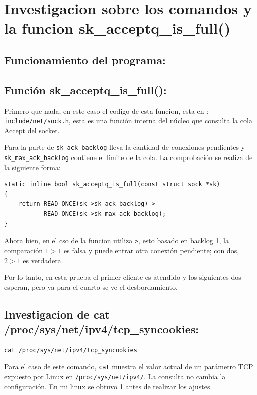 \documentclass[letterpaper,11pt]{article}
\begin{document}

\newpage
{\hypersetup{linkcolor=black}\tableofcontents}
\thispagestyle{empty}
\newpage
\setcounter{page}{1}
\singlespacing

\section{Investigacion sobre los comandos y la funcion sk\_acceptq\_is\_full()}

\subsection{Funcionamiento del programa:}

\subsection{Función sk\_acceptq\_is\_full():}

Primero que nada, en este caso el codigo de esta funcion, esta en :
\texttt{include/net/sock.h}, esta es una función interna del 
núcleo que consulta la cola Accept del socket.

Para la parte de \texttt{sk\_ack\_backlog} lleva la 
cantidad de conexiones pendientes y 
\texttt{sk\_max\_ack\_backlog} contiene el límite de la cola. 
La comprobación se realiza de la siguiente forma:

\begin{lstlisting}[style=cstyle,caption={Comparación utilizada para revisar la cola Accept.}]
static inline bool sk_acceptq_is_full(const struct sock *sk)
{
    return READ_ONCE(sk->sk_ack_backlog) >
           READ_ONCE(sk->sk_max_ack_backlog);
}
\end{lstlisting}

Ahora bien, en el cso de la funcion utiliza \texttt{>}, esto basado en 
backlog 1, la comparación $1 > 1$ es falsa y 
puede entrar otra conexión pendiente; 
con dos, $2 > 1$ es verdadera. 

Por lo tanto, en esta prueba el primer cliente es atendido y 
los siguientes dos esperan, pero 
ya para el cuarto se ve el desbordamiento. 

\subsection{Investigacion de cat /proc/sys/net/ipv4/tcp\_syncookies:}

\begin{lstlisting}[style=output]
cat /proc/sys/net/ipv4/tcp_syncookies
\end{lstlisting}
Para el caso de este comando, \texttt{cat} muestra el valor actual de un 
parámetro TCP expuesto por Linux en \texttt{/proc/sys/net/ipv4/}. 
La consulta no cambia la configuración. En mi linux se obtuvo 1 
antes de realizar los ajustes.
\end{document}
